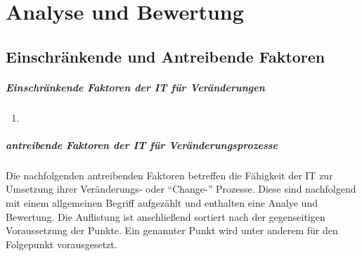 \chapter{Analyse und Bewertung}
\label{chapter:evaluation}

\section{Einschränkende und Antreibende Faktoren}
\label{section:faktoren-change}

\paragraph{Einschränkende Faktoren der IT für Veränderungen}
\begin{enumerate}
    \item 
\end{enumerate}

\paragraph{antreibende Faktoren der IT für Veränderungsprozesse}
Die nachfolgenden antreibenden Faktoren betreffen die Fähigkeit der IT zur Umsetzung ihrer Veränderungs- oder \enquote{Change-} Prozesse. Diese sind nachfolgend mit einem allgemeinen Begriff aufgezählt und enthalten eine Analye und Bewertung. Die Auflistung ist anschließend sortiert nach der gegenseitigen Voraussetzung der Punkte. Ein genannter Punkt wird unter anderem für den Folgepunkt vorausgesetzt.

